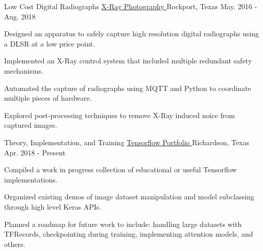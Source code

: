 

\begin{cventries}
  \cventry
    {Low Cost Digital Radiographs} %
		{
			\href{https://github.com/TidalPaladin/xray-controller.git}
			{X-Ray Photography \faGithubSquare}
		} %
    {Rockport, Texas} %
    {May. 2016 - Aug. 2018} %
	{
	\begin{cvitems}
		\item {
			Designed an apparatus to safely capture high resolution
			digital radiographs using a DLSR at
			a low price point.
		}
		\item {
			Implemented an X-Ray control system that included multiple
			redundant safety mechanisms.
		}
		\item {
			Automated the capture of radiographs using MQTT and Python
			to coordinate multiple pieces of hardware.
		}
		\item {
			Explored post-processing techniques to remove X-Ray induced
			noice from captured images.
		}
	\end{cvitems}
	}

  \cventry
  	{Theory, Implementation, and Training} %
		{
			\href{https://github.com/TidalPaladin/tensorflow-demos}
			{Tensorflow Portfolio \faGithubSquare}
		} %
    {Richardson, Texas} %
  	{Apr. 2018 - Present} %
	{
	\begin{cvitems}
		\item {
			Compiled a work in progress collection of educational or useful
			Tensorflow implementations.
		}
		\item {
			Organized existing demos of image dataset manipulation and model
			subclassing through high level Keras APIs.
		}
		\item {
			Planned a roadmap for future work to include: handling large
			datasets with TFRecords, checkpointing during training,
			\newline
			implementing attention models, and others.
		}
	\end{cvitems}
	}


\end{cventries}
